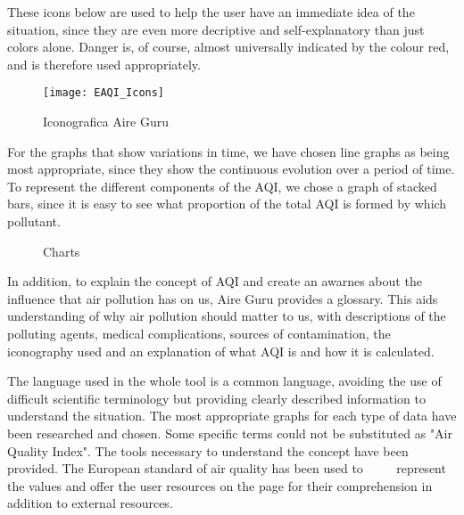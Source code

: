 These icons below are used to help the user have an immediate idea of the situation, since they are even more
decriptive and self-explanatory than just colors alone. Danger is, of course, almost universally indicated by the colour red, and is therefore used appropriately.\\
\begin{figure}[ht]
    \centering
    \texttt{[image: EAQI\_Icons]}
    \caption{Iconografica Aire Guru}
\end{figure}

For the graphs that show variations in time,  we have chosen line graphs as being most appropriate,
since they show the continuous evolution over a period of time. To represent the different components of the AQI, we chose a
graph of stacked bars, since it is easy to see what proportion of the total AQI is formed by which pollutant. \\
\begin{figure}[ht]
    \centering
     \hfill
 
    \caption{Charts}
\end{figure}

In addition, to explain the concept of AQI and create an awarnes about the influence that air pollution has on us, Aire Guru provides a
glossary. This aids understanding of why air pollution should matter to us, with descriptions of the polluting agents, medical complications, sources of contamination, the iconography used and
an explanation of what AQI is and how it is calculated. \\

 
\begin{itemize}
    \done The language used in the whole tool is a common language, avoiding the use of difficult scientific terminology but providing clearly described information to understand the situation.
    \done The most appropriate graphs for each type of data have been researched and chosen.
    \crossed Some specific terms could not be substituted as "Air Quality Index".
    \done The tools necessary to understand the concept have been provided. The European standard of air quality has been used to
         represent the values and offer the user resources on the page for their comprehension in addition to external resources.
\end{itemize}
 

\newpage